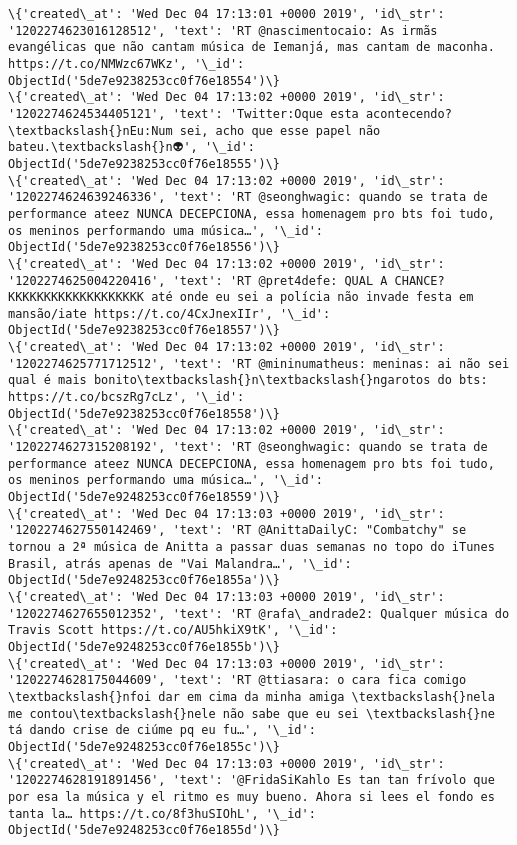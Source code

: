 \documentclass[11pt]{article}
\begin{document}
\begin{Verbatim}[commandchars=\\\{\}]
\{'created\_at': 'Wed Dec 04 17:13:01 +0000 2019', 'id\_str': '1202274623016128512', 'text': 'RT @nascimentocaio: As irmãs evangélicas que não cantam música de Iemanjá, mas cantam de maconha. https://t.co/NMWzc67WKz', '\_id': ObjectId('5de7e9238253cc0f76e18554')\}
\{'created\_at': 'Wed Dec 04 17:13:02 +0000 2019', 'id\_str': '1202274624534405121', 'text': 'Twitter:Oque esta acontecendo?\textbackslash{}nEu:Num sei, acho que esse papel não bateu.\textbackslash{}n👽', '\_id': ObjectId('5de7e9238253cc0f76e18555')\}
\{'created\_at': 'Wed Dec 04 17:13:02 +0000 2019', 'id\_str': '1202274624639246336', 'text': 'RT @seonghwagic: quando se trata de performance ateez NUNCA DECEPCIONA, essa homenagem pro bts foi tudo, os meninos performando uma música…', '\_id': ObjectId('5de7e9238253cc0f76e18556')\}
\{'created\_at': 'Wed Dec 04 17:13:02 +0000 2019', 'id\_str': '1202274625004220416', 'text': 'RT @pret4defe: QUAL A CHANCE? KKKKKKKKKKKKKKKKKKK até onde eu sei a polícia não invade festa em mansão/iate https://t.co/4CxJnexIIr', '\_id': ObjectId('5de7e9238253cc0f76e18557')\}
\{'created\_at': 'Wed Dec 04 17:13:02 +0000 2019', 'id\_str': '1202274625771712512', 'text': 'RT @mininumatheus: meninas: ai não sei qual é mais bonito\textbackslash{}n\textbackslash{}ngarotos do bts: https://t.co/bcszRg7cLz', '\_id': ObjectId('5de7e9238253cc0f76e18558')\}
\{'created\_at': 'Wed Dec 04 17:13:02 +0000 2019', 'id\_str': '1202274627315208192', 'text': 'RT @seonghwagic: quando se trata de performance ateez NUNCA DECEPCIONA, essa homenagem pro bts foi tudo, os meninos performando uma música…', '\_id': ObjectId('5de7e9248253cc0f76e18559')\}
\{'created\_at': 'Wed Dec 04 17:13:03 +0000 2019', 'id\_str': '1202274627550142469', 'text': 'RT @AnittaDailyC: "Combatchy" se tornou a 2ª música de Anitta a passar duas semanas no topo do iTunes Brasil, atrás apenas de "Vai Malandra…', '\_id': ObjectId('5de7e9248253cc0f76e1855a')\}
\{'created\_at': 'Wed Dec 04 17:13:03 +0000 2019', 'id\_str': '1202274627655012352', 'text': 'RT @rafa\_andrade2: Qualquer música do Travis Scott https://t.co/AU5hkiX9tK', '\_id': ObjectId('5de7e9248253cc0f76e1855b')\}
\{'created\_at': 'Wed Dec 04 17:13:03 +0000 2019', 'id\_str': '1202274628175044609', 'text': 'RT @ttiasara: o cara fica comigo \textbackslash{}nfoi dar em cima da minha amiga \textbackslash{}nela me contou\textbackslash{}nele não sabe que eu sei \textbackslash{}ne tá dando crise de ciúme pq eu fu…', '\_id': ObjectId('5de7e9248253cc0f76e1855c')\}
\{'created\_at': 'Wed Dec 04 17:13:03 +0000 2019', 'id\_str': '1202274628191891456', 'text': '@FridaSiKahlo Es tan tan frívolo que por esa la música y el ritmo es muy bueno. Ahora si lees el fondo es tanta la… https://t.co/8f3huSIOhL', '\_id': ObjectId('5de7e9248253cc0f76e1855d')\}

\end{Verbatim}
\end{document}
